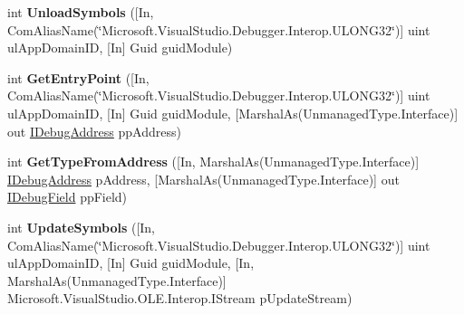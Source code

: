 \begin{DoxyCompactItemize}
\item 
\hypertarget{interface_microsoft_1_1_visual_studio_1_1_debugger_1_1_interop_e_e_1_1_i_debug_com_plus_symbol_provider2_ac0d8bf18c2c74a0172ab0ea1646efb32}{int {\bfseries Unload\+Symbols} (\mbox{[}In, Com\+Alias\+Name(\char`\"{}Microsoft.\+Visual\+Studio.\+Debugger.\+Interop.\+U\+L\+O\+N\+G32\char`\"{})\mbox{]} uint ul\+App\+Domain\+I\+D, \mbox{[}In\mbox{]} Guid guid\+Module)}\label{interface_microsoft_1_1_visual_studio_1_1_debugger_1_1_interop_e_e_1_1_i_debug_com_plus_symbol_provider2_ac0d8bf18c2c74a0172ab0ea1646efb32}

\item 
\hypertarget{interface_microsoft_1_1_visual_studio_1_1_debugger_1_1_interop_e_e_1_1_i_debug_com_plus_symbol_provider2_ac27f21619ea44dba05aec4d40c848079}{int {\bfseries Get\+Entry\+Point} (\mbox{[}In, Com\+Alias\+Name(\char`\"{}Microsoft.\+Visual\+Studio.\+Debugger.\+Interop.\+U\+L\+O\+N\+G32\char`\"{})\mbox{]} uint ul\+App\+Domain\+I\+D, \mbox{[}In\mbox{]} Guid guid\+Module, \mbox{[}Marshal\+As(Unmanaged\+Type.\+Interface)\mbox{]} out \hyperlink{interface_microsoft_1_1_visual_studio_1_1_debugger_1_1_interop_e_e_1_1_i_debug_address}{I\+Debug\+Address} pp\+Address)}\label{interface_microsoft_1_1_visual_studio_1_1_debugger_1_1_interop_e_e_1_1_i_debug_com_plus_symbol_provider2_ac27f21619ea44dba05aec4d40c848079}

\item 
\hypertarget{interface_microsoft_1_1_visual_studio_1_1_debugger_1_1_interop_e_e_1_1_i_debug_com_plus_symbol_provider2_accdded4c84dbde70126205856f6916a3}{int {\bfseries Get\+Type\+From\+Address} (\mbox{[}In, Marshal\+As(Unmanaged\+Type.\+Interface)\mbox{]} \hyperlink{interface_microsoft_1_1_visual_studio_1_1_debugger_1_1_interop_e_e_1_1_i_debug_address}{I\+Debug\+Address} p\+Address, \mbox{[}Marshal\+As(Unmanaged\+Type.\+Interface)\mbox{]} out \hyperlink{interface_microsoft_1_1_visual_studio_1_1_debugger_1_1_interop_e_e_1_1_i_debug_field}{I\+Debug\+Field} pp\+Field)}\label{interface_microsoft_1_1_visual_studio_1_1_debugger_1_1_interop_e_e_1_1_i_debug_com_plus_symbol_provider2_accdded4c84dbde70126205856f6916a3}

\item 
\hypertarget{interface_microsoft_1_1_visual_studio_1_1_debugger_1_1_interop_e_e_1_1_i_debug_com_plus_symbol_provider2_ada02fbd6a979503c5790f05b91b4ed4f}{int {\bfseries Update\+Symbols} (\mbox{[}In, Com\+Alias\+Name(\char`\"{}Microsoft.\+Visual\+Studio.\+Debugger.\+Interop.\+U\+L\+O\+N\+G32\char`\"{})\mbox{]} uint ul\+App\+Domain\+I\+D, \mbox{[}In\mbox{]} Guid guid\+Module, \mbox{[}In, Marshal\+As(Unmanaged\+Type.\+Interface)\mbox{]} Microsoft.\+Visual\+Studio.\+O\+L\+E.\+Interop.\+I\+Stream p\+Update\+Stream)}\label{interface_microsoft_1_1_visual_studio_1_1_debugger_1_1_interop_e_e_1_1_i_debug_com_plus_symbol_provider2_ada02fbd6a979503c5790f05b91b4ed4f}


\end{DoxyCompactItemize}
